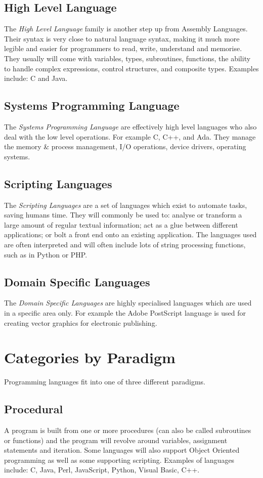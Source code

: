 \subsection{High Level Language}
The \textit{High Level Language} family is another step up from Assembly Languages. Their syntax is very close to natural language syntax, making it much more legible and easier for programmers to read, write, understand and memorise. They usually will come with variables, types, subroutines, functions, the ability to handle complex expressions, control structures, and composite types. Examples include: C and Java.
\subsection{Systems Programming Language}
The \textit{Systems Programming Language} are effectively high level languages who also deal with the low level operations. For example C, C++, and Ada. They manage the memory \& process management, I/O operations, device drivers, operating systems. 
\subsection{Scripting Languages}
The \textit{Scripting Languages} are a set of languages which exist to automate tasks, saving humans time. They will commonly be used to: analyse or transform a large amount of regular textual information; act as a glue between different applications; or bolt a front end onto an existing application. The languages used are often interpreted and will often include lots of string processing functions, such as in Python or PHP. 

\subsection{Domain Specific Languages}
The \textit{Domain Specific Languages} are highly specialised languages which are used in a specific area only. For example the Adobe PostScript language is used for creating vector graphics for electronic publishing.

\section{Categories by Paradigm}
Programming languages fit into one of three different paradigms.
\subsection{Procedural}
A program is built from one or more procedures (can also be called subroutines or functions) and the program will revolve around variables, assignment statements and iteration. Some languages will also support Object Oriented programming as well as some supporting scripting. Examples of languages include: C, Java, Perl, JavaScript, Python, Visual Basic, C++.
